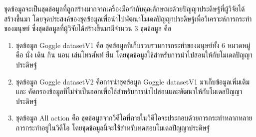 ชุดข้อมูลจะเป็นชุดข้อมูลที่ถูกสร้างมากจากเครื่องมือกำกับคุณลักษณะด้วยปัญญาประดิษฐ์ที่ผู้วิจัยได้สร้างขึ้นมา โดยจุดประสงค์ของชุดข้อมูลเพื่อนำไปพัฒนาโมเดลปัญญาประดิษฐ์เพื่อวิเคราะห์การกระทำของมนุษย์ ซึ่งชุดข้อมูลที่ผู้วิจัยได้สร้างขึ้นมามีจำนวน 3 ชุดข้อมูล คือ 
\begin{enumerate}
	\item ชุดข้อมูล Goggle datasetV1 คือ ชุดข้อมูลที่เก็บรวบรวมการกระทำของมนุษย์ทั้ง 6 หมวดหมู่ คือ นั่ง เดิน กิน นอน เล่นโทรศัพท์ ยืน โดยชุดข้อมูลใช้สำหรับการนำไปสอนให้กับโมเดลปัญญาประดิษฐ์
	\item ชุดข้อมูล Goggle datasetV2 คือการนำชุดข้อมูล Goggle datasetV1 มาเก็บข้อมูลเพิ่มเติม และ คัดกรองข้อมูลที่ไม่จำเป็นออกเพื่อใช้สำหรับการนำไปสอนและพัฒนาให้กับโมเดลปัญญาประดิษฐ์
	\item ชุดข้อมูล All action คือ ชุดข้อมูลจากวิดีโอที่ภายในวิดีโอจะประกอบด้วยการกระทำหลากหลายการกระทำอยู่ในวิดีโอ โดยชุดข้อมูลนี้จะใช้สำหรับทดสอบโมเดลปัญญาประดิษฐ์

\end{enumerate}	